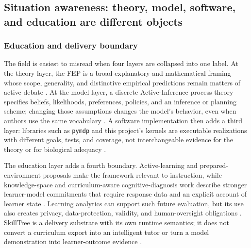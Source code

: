 \documentclass[
  english,
]{article}
\begin{document}
\subsection{Situation awareness: theory, model, software, and education
are different
objects}\label{situation-awareness-theory-model-software-and-education-are-different-objects}

\subsubsection{Education and delivery
boundary}\label{education-and-delivery-boundary}

The field is easiest to misread when four layers are collapsed into one
label. At the theory layer, the FEP is a broad explanatory and
mathematical framing whose scope, generality, and distinctive empirical
predictions remain matters of active debate
\citep{friston2023simpler, aguilera2022particular, gershman2019free, hodson2024empirical}.
At the model layer, a discrete Active-Inference process theory specifies
beliefs, likelihoods, preferences, policies, and an inference or
planning scheme; changing those assumptions changes the model's
behavior, even when authors use the same vocabulary
\citep{friston2017process, dacosta2020synthesis, parr2022active, millidge2021whence}.
A software implementation then adds a third layer: libraries such as
\texttt{pymdp} and this project's kernels are executable realizations
with different goals, tests, and coverage, not interchangeable evidence
for the theory or for biological adequacy
\citep{heins2022pymdp, vanoostrum2025concise}.

The education layer adds a fourth boundary. Active-learning and
prepared-environment proposals make the framework relevant to
instruction, while knowledge-space and curriculum-aware
cognitive-diagnosis work describe stronger learner-model commitments
that require response data and an explicit account of learner state
\citep{dipaolo2024school, doignon1985knowledge_spaces, falmagne2011learning_spaces, fu2025curriculum_aware_gncd}.
Learning analytics can support such future evaluation, but its use also
creates privacy, data-protection, validity, and human-oversight
obligations
\citep{liu2023_learning_analytics_privacy, sclater2015learning_analytics_code}.
SkillTree is a delivery substrate with its own runtime semantics; it
does not convert a curriculum export into an intelligent tutor or turn a
model demonstration into learner-outcome evidence
\citep{skilltree2026docs, skilltree2020nsa}.
\end{document}
